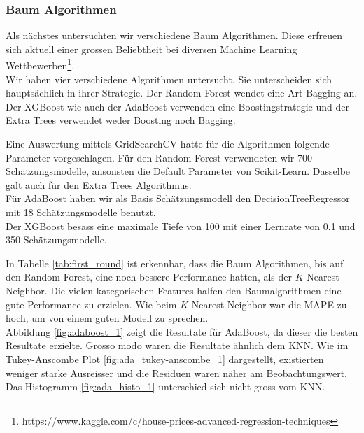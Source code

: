 \subsubsection{Baum Algorithmen}
Als nächstes untersuchten wir verschiedene Baum Algorithmen. Diese erfreuen sich aktuell einer grossen Beliebtheit bei diversen Machine Learning Wettbewerben\footnote{https://www.kaggle.com/c/house-prices-advanced-regression-techniques}.\\[2ex]
%
Wir haben vier verschiedene Algorithmen untersucht. Sie unterscheiden sich hauptsächlich in ihrer Strategie. Der Random Forest wendet eine Art Bagging an. Der XGBoost wie auch der AdaBoost verwenden eine Boostingstrategie und der Extra Trees verwendet weder Boosting noch Bagging.

Eine Auswertung mittels GridSearchCV hatte für die Algorithmen folgende Parameter vorgeschlagen.
Für den Random Forest verwendeten wir 700 Schätzungsmodelle, ansonsten die Default Parameter von Scikit-Learn. Dasselbe galt auch für den Extra Trees Algorithmus.\\
Für AdaBoost haben wir als Basis Schätzungsmodell den DecisionTreeRegressor mit 18 Schätzungsmodelle benutzt.\\
Der XGBoost besass eine maximale Tiefe von 100 mit einer Lernrate von 0.1 und 350 Schätzungsmodelle.

\begin{table}[ht]
\centering
{}
\caption{Ergebnisse der Baum Algorithmen}
\label{tab:first_round}
\end{table}

In Tabelle \ref{tab:first_round} ist erkennbar, dass die Baum Algorithmen, bis auf den Random Forest, eine noch bessere Performance hatten, als der $K$-Nearest Neighbor. Die vielen kategorischen Features halfen den Baumalgorithmen eine gute Performance zu erzielen. Wie beim $K$-Nearest Neighbor war die MAPE zu hoch, um von einem guten Modell zu sprechen.\\
Abbildung \ref{fig:adaboost_1} zeigt die Resultate für AdaBoost, da dieser die besten Resultate erzielte. Gros­so mo­do waren die Resultate ähnlich dem KNN. Wie im Tukey-Anscombe Plot \ref{fig:ada_tukey-anscombe_1} dargestellt, existierten weniger starke Ausreisser und die Residuen waren näher am Beobachtungswert. Das Histogramm \ref{fig:ada_histo_1} unterschied sich nicht gross vom KNN.

